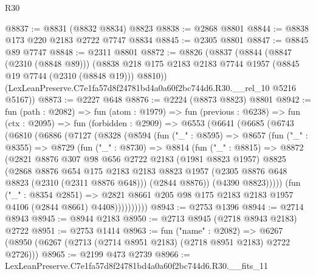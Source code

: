 \begin{lexlean}{R30}
\begin{coremodule}
@8837 := @8831 (@8832 @8834) @8823
@8838 := @2868 @8801
@8844 := @8838 @173 @220 @2183 @2722 @7747 @8834
@8845 := @2305 @8801
@8847 := @8845 @89 @7747
@8848 := @2311 @8801
@8872 := @8826
    (@8837
      (@8844
        (@8847 (@2310 (@8848 @89)))
        (@8838 @218 @175 @2183 @2183 @7744 @1957 (@8845 @19 @7744 (@2310 (@8848 @19))) @8810))
      (LexLeanPreserve.C7e1fa57d8f24781bd4a0a60f2bc744d6.R30.__rel_10 @5216 @5167))
@8873 := @2227 @648
@8876 := @2224 (@8873 @8823) @8801
@8942 := fun (path : @2082) =>
  fun (atom : @1979) =>
  fun (previous : @6238) =>
  fun (ctx : @2095) =>
  fun (forbidden : @2909) =>
  @6553
    (@6641
      (@6685
        (@6743
          (@6810
            (@6886
              (@7127
                (@8328
                  (@8594
                    (fun ("_" : @8595) =>
                    @8657
                      (fun ("_" : @8355) =>
                      @8729
                        (fun ("_" : @8730) =>
                        @8814
                          (fun ("_" : @8815) =>
                          @8872
                            (@2821
                              @8876
                              @307
                              @98
                              @656
                              @2722
                              @2183
                              (@1981 @8823 @1957)
                              @8825
                              (@2868
                                @8876
                                @654
                                @175
                                @2183
                                @2183
                                @8823
                                @1957
                                (@2305 @8876 @648 @8823 (@2310 (@2311 @8876 @648)))
                                (@2844 @8876))
                              (@4390 @8823)))))
                      (fun ("_" : @8354 @2851) =>
                      @2821
                        @8661
                        @205
                        @98
                        @175
                        @2183
                        @2183
                        @1957
                        @4106
                        (@2844 @8661)
                        @4408))))))))))
@8943 := @2753 @1396
@8944 := @2714 @8943
@8945 := @8944 @2183
@8950 := @2713 @8945 (@2718 @8943 @2183) @2722
@8951 := @2753 @1414
@8963 := fun ("name" : @2082) =>
  @6267 (@8950 (@6267 (@2713 (@2714 @8951 @2183) (@2718 @8951 @2183) @2722 @2726)))
@8965 := @2199 @473 @2739
@8966 := LexLeanPreserve.C7e1fa57d8f24781bd4a0a60f2bc744d6.R30.__fits_11

\end{coremodule}
\end{lexlean}
